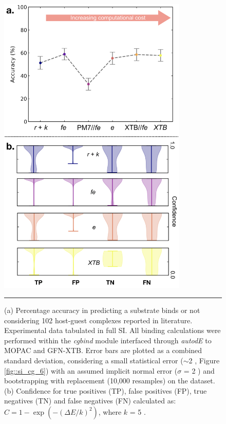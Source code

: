 \documentclass[../../main.tex]{subfiles}
\newcommand{\cgbind}{\emph{cgbind }}
\begin{document}
\begin{figure}[h!]
	\vspace{0.4cm}
	\centering
	\includegraphics[width=9cm]{3/cgbind/figs/fig7}
	\vspace{0.2cm}
	\hrule
	\caption{(a) Percentage accuracy in predicting a substrate binds or not considering 102 host-guest complexes reported in literature. Experimental data tabulated in full SI. All binding calculations were performed within the \cgbind module interfaced through \emph{autodE} to MOPAC and GFN-XTB. Error bars are plotted as a combined standard deviation, considering a small statistical error ($\sim$2 \kcal, Figure \ref{fig::si_cg_6}) with an assumed implicit normal error ($\sigma$ = 2 \kcal) and bootstrapping with replacement (10,000 resamples) on the dataset. (b) Confidence for true positives (TP), false positives (FP), true negatives (TN) and false negatives (FN) calculated as: $C = 1 - \exp(-(\Delta E/k)^2)$, where $k$ = 5 \kcal.}
	\label{fig::cg_7}
\end{figure}

\clearpage
\end{document}
